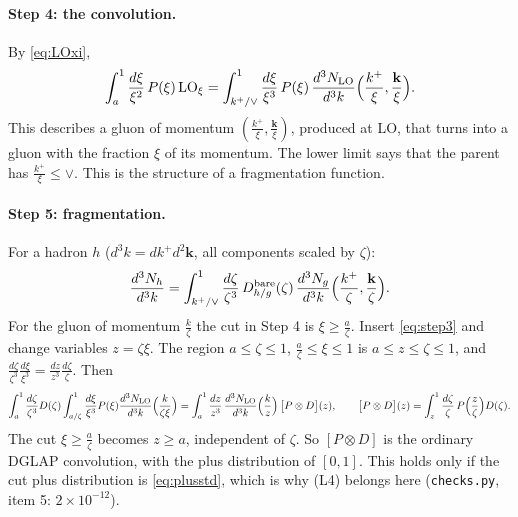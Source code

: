 \documentclass[10pt]{article}
\numberwithin{equation}{section}
\begin{document}
\paragraph{Step 4: the convolution.} By \eqref{eq:LOxi},
\begin{equation}
\int_a^1\frac{d\xi}{\xi^2}\,P(\xi)\,{\rm LO}_\xi=\int_{k^+/\vee}^1\frac{d\xi}{\xi^3}\,P(\xi)\,\frac{d^3N_{\rm LO}}{d^3k}\Big(\frac{k^+}{\xi},\frac{\mathbf k}{\xi}\Big).
\end{equation}
This describes a gluon of momentum $(\frac{k^+}{\xi},\frac{\mathbf k}{\xi})$, produced at LO, that turns into a gluon with the fraction $\xi$ of its momentum. The lower limit says that the parent has $\frac{k^+}{\xi}\le\vee$. This is the structure of a fragmentation function.

\paragraph{Step 5: fragmentation.} For a hadron $h$ ($d^3k=dk^+d^2\mathbf k$, all components scaled by $\zeta$):
\begin{equation}
\frac{d^3N_h}{d^3k}=\int_{k^+/\vee}^1\frac{d\zeta}{\zeta^3}\,D^{\rm bare}_{h/g}(\zeta)\,\frac{d^3N_g}{d^3k}\Big(\frac{k^+}{\zeta},\frac{\mathbf k}{\zeta}\Big).\label{eq:frag}
\end{equation}
For the gluon of momentum $\frac{k}{\zeta}$ the cut in Step 4 is $\xi\ge\frac{a}{\zeta}$. Insert \eqref{eq:step3} and change variables $z=\zeta\xi$. The region $a\le\zeta\le1$, $\frac{a}{\zeta}\le\xi\le1$ is $a\le z\le\zeta\le1$, and $\frac{d\zeta}{\zeta^3}\frac{d\xi}{\xi^3}=\frac{dz}{z^3}\frac{d\zeta}{\zeta}$. Then
\begin{equation}
\int_a^1\frac{d\zeta}{\zeta^3}D(\zeta)\int_{a/\zeta}^1\frac{d\xi}{\xi^3}P(\xi)\frac{d^3N_{\rm LO}}{d^3k}\Big(\frac{k}{\zeta\xi}\Big)=\int_a^1\frac{dz}{z^3}\,\frac{d^3N_{\rm LO}}{d^3k}\Big(\frac{k}{z}\Big)\,\big[P\otimes D\big](z),\qquad\big[P\otimes D\big](z)=\int_z^1\frac{d\zeta}{\zeta}\,P\Big(\frac{z}{\zeta}\Big)D(\zeta).\label{eq:conv}
\end{equation}
The cut $\xi\ge\frac{a}{\zeta}$ becomes $z\ge a$, independent of $\zeta$. So $[P\otimes D]$ is the ordinary DGLAP convolution, with the plus distribution of $[0,1]$. This holds only if the cut plus distribution is \eqref{eq:plusstd}, which is why (L4) belongs here (\texttt{checks.py}, item 5: $2\times10^{-12}$).
\end{document}

